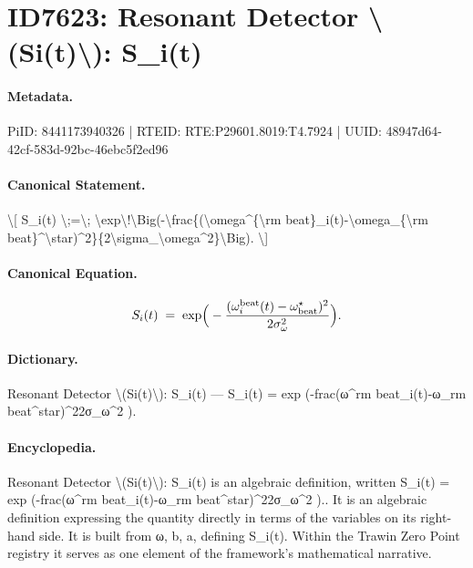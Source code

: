 \section*{ID7623: Resonant Detector \textbackslash{}(Si(t)\textbackslash{}): S\_i(t)}
\paragraph{Metadata.}
PiID: 8441173940326 | RTEID: RTE:P29601.8019:T4.7924 | UUID: 48947d64-42cf-583d-92bc-46ebc5f2ed96

\paragraph{Canonical Statement.}
\textbackslash{}[ S\_i(t) \textbackslash{};=\textbackslash{}; \textbackslash{}exp\textbackslash{}!\textbackslash{}Big(-\textbackslash{}frac\{(\textbackslash{}omega\textasciicircum{}\{\textbackslash{}rm beat\}\_i(t)-\textbackslash{}omega\_\{\textbackslash{}rm beat\}\textasciicircum{}\textbackslash{}star)\textasciicircum{}2\}\{2\textbackslash{}sigma\_\textbackslash{}omega\textasciicircum{}2\}\textbackslash{}Big). \textbackslash{}]

\paragraph{Canonical Equation.}
\[
S_i(t) \;=\; \exp\!\Big(-\frac{(\omega^{\rm beat}_i(t)-\omega_{\rm beat}^\star)^2}{2\sigma_\omega^2}\Big).
\]

\paragraph{Dictionary.}
Resonant Detector \textbackslash{}(Si(t)\textbackslash{}): S\_i(t) — S\_i(t) = exp (-frac(ω\textasciicircum{}rm beat\_i(t)-ω\_rm beat\textasciicircum{}star)\textasciicircum{}22σ\_ω\textasciicircum{}2 ).

\paragraph{Encyclopedia.}
Resonant Detector \textbackslash{}(Si(t)\textbackslash{}): S\_i(t) is an algebraic definition, written S\_i(t) = exp (-frac(ω\textasciicircum{}rm beat\_i(t)-ω\_rm beat\textasciicircum{}star)\textasciicircum{}22σ\_ω\textasciicircum{}2 ).. It is an algebraic definition expressing the quantity directly in terms of the variables on its right-hand side. It is built from ω, b, a, defining S\_i(t). Within the Trawin Zero Point registry it serves as one element of the framework's mathematical narrative.
